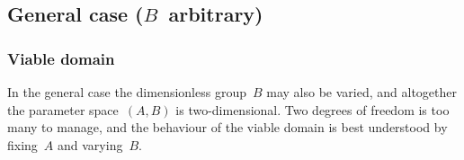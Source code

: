 \subsection{General case (\texorpdfstring{$B$~arbitrary}{B arbitrary})}
\label{sec:cartesian.cosine.general}

\subsubsection{Viable domain}
\label{sec:cartesian.cosine.general.viable}

In the general case the dimensionless group~$B$ may also be varied,
and altogether the parameter space~$(A, B)$ is two-dimensional.
Two degrees of freedom is too many to manage,
and the behaviour of the viable domain is best understood
by fixing~$A$ and varying~$B$.

\begin{figure}
\end{figure}


